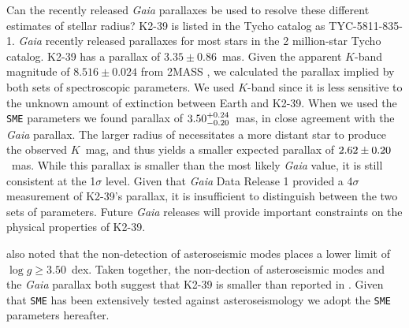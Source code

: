 \documentclass[preprint2]{aastex6}
\newcommand{\SME}{\texttt{SME}\xspace}
\newcommand{\Gaia}{\textit{Gaia}\xspace}
\newcommand{\logg}{\ensuremath{\log g}\xspace}
\begin{document}
Can the recently released {\em Gaia} parallaxes be used to resolve these different estimates of stellar radius? K2-39 is listed in the Tycho catalog as TYC-5811-835-1. \Gaia recently released parallaxes for most stars in the 2 million-star Tycho catalog. K2-39 has a parallax of $3.35\pm0.86$~mas.  Given the apparent $K$-band magnitude of $8.516 \pm 0.024$ from 2MASS \citep{Cutri03}, we calculated the parallax implied by both sets of spectroscopic parameters. We used $K$-band since it is less sensitive to the unknown amount of extinction between Earth and K2-39. When we used the \SME parameters we found parallax of $\val{K2-39-star}{plx}$~mas, in close agreement with the \Gaia parallax. The larger radius of \cite{VanEylen16b} necessitates a more distant star to produce the observed $K$~mag, and thus yields a smaller expected parallax of $\val{K2-39-star-VE}{plx}$~mas. While this parallax is smaller than the most likely \Gaia value, it is still consistent at the 1$\sigma$ level. Given that \Gaia Data Release 1 provided a 4$\sigma$ measurement of K2-39's parallax, it is insufficient to distinguish between the two sets of parameters. Future \Gaia releases will provide important constraints on the physical properties of K2-39. 

\cite{VanEylen16b} also noted that the non-detection of asteroseismic modes places a lower limit of $\logg \geq 3.50$~dex. Taken together, the non-dection of asteroseismic modes and the {\em Gaia} parallax both suggest that K2-39 is smaller than reported in \cite{VanEylen16b}. Given that \SME has been extensively tested against asteroseismology we adopt the \SME parameters hereafter. 
\end{document}
